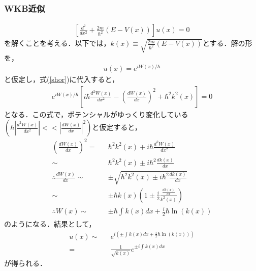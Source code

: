 \documentclass[12pt]{jsarticle}
\numberwithin{equation}{section}
\begin{document}
\subsubsection{WKB近似}
\begin{eqnarray}\label{shor}
	 \left[ \frac{d^2}{dx^2} + \frac{2m}{\hbar^2}(E-V(x)) \right]u(x) = 0
\end{eqnarray}
を解くことを考える．以下では，$k(x)\equiv\sqrt{\frac{2m}{\hbar^2}(E-V(x))}$とする．解の形を，
\begin{eqnarray}
	u(x) = e^{iW(x)/\hbar}
\end{eqnarray}
と仮定し，式(\ref{shor})に代入すると，
\begin{eqnarray}\label{equation W}
	 e^{iW(x)/\hbar} \left[i\hbar\frac{d^2W(x)}{dx^2} -\left(\frac{dW(x)}{dx}\right)^2 + \hbar^2k^2(x) \right] = 0
\end{eqnarray}
となる．この式で，ポテンシャルがゆっくり変化している$\left(\hbar \left|\frac{d^2W(x)}{dx^2}\right| << \left|\frac{dW(x)}{dx}\right|^2\right)$と仮定すると，
\begin{eqnarray}
	\left(\frac{dW(x)}{dx}\right)^2 =&& \hbar^2 k^2(x) + i\hbar \frac{d^2W(x)}{dx^2} \nonumber\\
	\sim&& \hbar^2 k^2(x) \pm i\hbar^2 \frac{dk(x)}{dx} \nonumber\\
	\therefore \frac{dW(x)}{dx} \sim&&  \pm \sqrt{\hbar^2 k^2(x) \pm i\hbar^2 \frac{dk(x)}{dx}} \nonumber\\
	\sim&&\pm \hbar k(x) \left(1 \pm \frac{i}{2}\frac{\frac{dk(x)}{dx}}{k^2(x)}\right) \nonumber\\
	\therefore W(x) \sim&& \pm \hbar \int_{}^{}k(x)dx + \frac{i}{2}\hbar\ln(k(x))
\end{eqnarray}
のようになる．結果として，
\begin{eqnarray}
	u(x) \sim&& e^{i \left(\pm\int_{}^{}k(x)dx + \frac{i}{2}\hbar\ln(k(x))\right)} \nonumber\\
	=&& \frac{1}{\sqrt{k(x)}} e^{\pm i \int_{}^{}k(x)dx}
\end{eqnarray}
が得られる．
\end{document}
